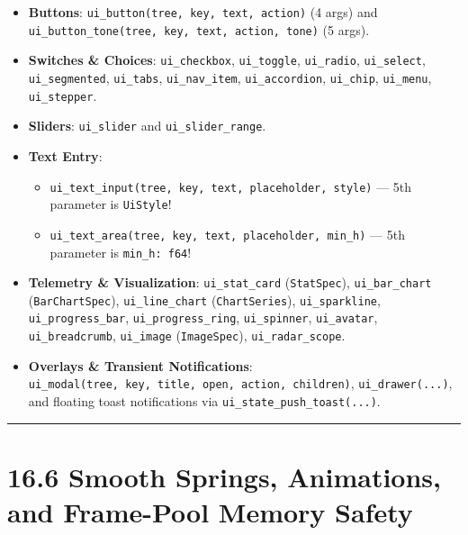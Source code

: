 \documentclass[
  english,
  oneside]{book}
\providecommand{\tightlist}{%
  \setlength{\itemsep}{0pt}\setlength{\parskip}{0pt}}
\begin{document}
\begin{itemize}
\tightlist
\item
  \textbf{Buttons}: \texttt{ui\_button(tree,\ key,\ text,\ action)} (4
  args) and \texttt{ui\_button\_tone(tree,\ key,\ text,\ action,\ tone)}
  (5 args).
\item
  \textbf{Switches \& Choices}: \texttt{ui\_checkbox},
  \texttt{ui\_toggle}, \texttt{ui\_radio}, \texttt{ui\_select},
  \texttt{ui\_segmented}, \texttt{ui\_tabs}, \texttt{ui\_nav\_item},
  \texttt{ui\_accordion}, \texttt{ui\_chip}, \texttt{ui\_menu},
  \texttt{ui\_stepper}.
\item
  \textbf{Sliders}: \texttt{ui\_slider} and \texttt{ui\_slider\_range}.
\item
  \textbf{Text Entry}:

  \begin{itemize}
  \tightlist
  \item
    \texttt{ui\_text\_input(tree,\ key,\ text,\ placeholder,\ style)}
    --- 5th parameter is \texttt{UiStyle}!
  \item
    \texttt{ui\_text\_area(tree,\ key,\ text,\ placeholder,\ min\_h)}
    --- 5th parameter is \texttt{min\_h:\ f64}!
  \end{itemize}
\item
  \textbf{Telemetry \& Visualization}: \texttt{ui\_stat\_card}
  (\texttt{StatSpec}), \texttt{ui\_bar\_chart} (\texttt{BarChartSpec}),
  \texttt{ui\_line\_chart} (\texttt{ChartSeries}),
  \texttt{ui\_sparkline}, \texttt{ui\_progress\_bar},
  \texttt{ui\_progress\_ring}, \texttt{ui\_spinner},
  \texttt{ui\_avatar}, \texttt{ui\_breadcrumb}, \texttt{ui\_image}
  (\texttt{ImageSpec}), \texttt{ui\_radar\_scope}.
\item
  \textbf{Overlays \& Transient Notifications}:
  \texttt{ui\_modal(tree,\ key,\ title,\ open,\ action,\ children)},
  \texttt{ui\_drawer(...)}, and floating toast notifications via
  \texttt{ui\_state\_push\_toast(...)}.
\end{itemize}

\begin{center}\rule{0.5\linewidth}{0.5pt}\end{center}

\section{16.6 Smooth Springs, Animations, and Frame-Pool Memory
Safety}\label{smooth-springs-animations-and-frame-pool-memory-safety}
\end{document}
